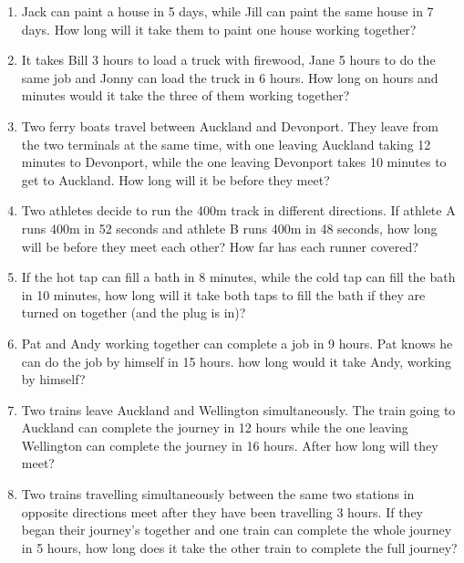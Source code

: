 \documentclass[a4paper,12pt]{article}
\begin{document}
\begin{tcolorbox}[colback=red!0!white, colframe=gray ,title=\subsection{Set Four - more difficult questions}\label{SetFour}]
\begin{enumerate}
	\item Jack can paint a house in 5 days, while Jill can paint the same house in 7 days. How long will it take them to paint one house working together?
\item It takes Bill 3 hours to load a truck with firewood, Jane 5 hours to do the same job and Jonny can load the truck in 6 hours. How long on hours and minutes would it take the three of them working together?
\item Two ferry boats travel between Auckland and Devonport. They leave from the two terminals at the same time, with one leaving Auckland taking 12 minutes to Devonport, while the one leaving Devonport takes 10 minutes to get to Auckland. How long will it be before they meet?
\item Two athletes decide to run the 400m track in different directions. If athlete A runs 400m in 52 seconds and athlete B runs 400m in 48 seconds, how long will be before they meet each other? How far has each runner covered?
\item If the hot tap can fill a bath in 8 minutes, while the cold tap can fill the bath in 10 minutes, how long will it take both taps to fill the bath if they are turned on together (and the plug is in)?
\item Pat and Andy working together can complete a job in 9 hours. Pat knows he can do the job by himself in 15 hours. how long would it take Andy, working by himself?
\item Two trains leave Auckland and Wellington simultaneously. The train going to Auckland can complete the journey in 12 hours while the one leaving Wellington can complete the journey in 16 hours. After how long will they meet?
\item Two trains travelling simultaneously between the same two stations in opposite directions meet after they have been travelling 3 hours. If they began their journey's together and one train can complete the whole journey in 5 hours, how long does it take the other train to complete the full journey?
\end{enumerate}
\end{tcolorbox}
\newpage
\end{document}
